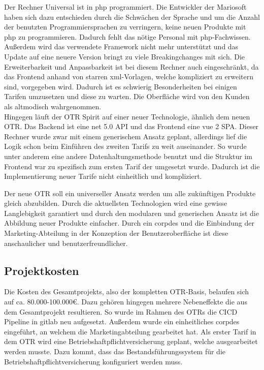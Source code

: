 Der Rechner \glqq Universal\grqq{} ist in \gls{php} programmiert. Die Entwickler der Mariosoft haben sich dazu entschieden durch die Schwächen der Sprache und um die Anzahl der benutzten Programmiersprachen zu verringern, keine neuen Produkte mit \gls{php} zu programmieren. Dadurch fehlt das nötige Personal mit \gls{php}-Fachwissen. Außerdem wird das verwendete Framework nicht mehr unterstützt und das Update auf eine neuere Version bringt zu viele Breakingchanges mit sich. Die Erweiterbarkeit und Anpassbarkeit ist bei diesem Rechner auch eingeschränkt, da das Frontend anhand von starren \gls{xml}-Vorlagen, welche kompliziert zu erweitern sind, vorgegeben wird. Dadurch ist es schwierig Besonderheiten bei einigen Tarifen umzusetzen und diese zu warten. Die Oberfläche wird von den Kunden als altmodisch wahrgenommen. \\
Hingegen läuft der \ac{OTR} \glqq Spirit\grqq{} auf einer neuer Technologie, ähnlich dem neuen \ac{OTR}. Das Backend ist eine \gls{net} 5.0 API und das Frontend eine \gls{vue} 2 \ac{SPA}. Dieser Rechner wurde zwar mit einem generischem Ansatz geplant, allerdings lief die Logik schon beim Einführen des zweiten Tarifs zu weit auseinander. So wurde unter anderem eine andere Datenhaltungsmethode benutzt und die Struktur im Frontend war zu spezifisch zum ersten Tarif der umgesetzt wurde. Dadurch ist die Implementierung neuer Tarife nicht einheitlich und kompliziert.

Der neue \ac{OTR} soll ein universeller Ansatz werden um alle zukünftigen Produkte gleich abzubilden. Durch die aktuellsten Technologien wird eine gewisse Langlebigkeit garantiert und durch den modularen und generischen Ansatz ist die Abbildung neuer Produkte einfacher. Durch ein \gls{corpdes} und die Einbindung der Marketing-Abteilung in der Konzeption der Benutzeroberfläche ist diese anschaulicher und benutzerfreundlicher.
\subsection{Projektkosten}
\label{projektkosten}
Die Kosten des Gesamtprojekts, also der kompletten \ac{OTR}-Basis, belaufen sich auf ca. 80.000-100.000€. Dazu gehören hingegen mehrere Nebeneffekte die aus dem Gesamtprojekt resultieren. So wurde im Rahmen des \ac{OTR}s die \ac{CICD} Pipeline in \gls{gitlab} neu aufgesetzt. Außerdem wurde ein einheitliches \gls{corpdes}	eingeführt, an welchem die Marketingabteilung gearbeitet hat. Als erster Tarif in dem \ac{OTR} wird eine Betriebshaftpflichtversicherung geplant, welche ausgearbeitet werden musste. Dazu kommt, dass das Bestandsführungssystem für die Betriebshaftpflichtversicherung konfiguriert werden muss.\\

